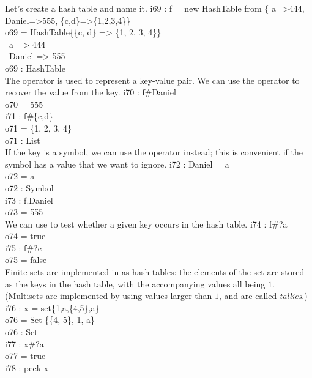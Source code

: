 Let's create a hash table and name it.
\beginOutput
i69 : f = new HashTable from \{ a=>444, Daniel=>555, \{c,d\}=>\{1,2,3,4\}\}\\
\emptyLine
o69 = HashTable\{\{c, d\} => \{1, 2, 3, 4\}\}\\
\                a => 444\\
\                Daniel => 555\\
\emptyLine
o69 : HashTable\\
\endOutput
The operator  is used to represent a key-value pair.
We can use the operator \indexcmd{\#}{\tt \#} to recover the value from the key.
\beginOutput
i70 : f#Daniel\\
\emptyLine
o70 = 555\\
\endOutput
\beginOutput
i71 : f#\{c,d\}\\
\emptyLine
o71 = \{1, 2, 3, 4\}\\
\emptyLine
o71 : List\\
\endOutput
If the key is a symbol, we can use the operator  instead; this is
convenient if the symbol has a value that we want to ignore.
\beginOutput
i72 : Daniel = a\\
\emptyLine
o72 = a\\
\emptyLine
o72 : Symbol\\
\endOutput
\beginOutput
i73 : f.Daniel\\
\emptyLine
o73 = 555\\
\endOutput
We can use  to test whether a given key occurs in the hash table.
\beginOutput
i74 : f#?a\\
\emptyLine
o74 = true\\
\endOutput
\beginOutput
i75 : f#?c\\
\emptyLine
o75 = false\\
\endOutput
Finite sets are implemented in \Mtwo as hash tables: the elements of the set
are stored as the keys in the hash table, with the accompanying values all
being $1$.  (Multisets are implemented by using values larger than $1$, and
are called {\sl tallies}.)
\beginOutput
i76 : x = set\{1,a,\{4,5\},a\}\\
\emptyLine
o76 = Set \{\{4, 5\}, 1, a\}\\
\emptyLine
o76 : Set\\
\endOutput
{}%
\beginOutput
i77 : x#?a\\
\emptyLine
o77 = true\\
\endOutput
\beginOutput
i78 : peek x\\
